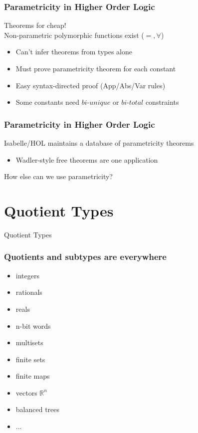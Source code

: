 \documentclass[english]{beamer}
\begin{document}
\begin{frame}
\frametitle{Parametricity in Higher Order Logic}
{\large{Theorems for  cheap!}}\\
\bigskip
Non-parametric polymorphic functions exist ($=, \forall$)
\begin{itemize}
\item Can't infer theorems from types alone
\item Must prove parametricity theorem for each constant
\item Easy syntax-directed proof (App/Abs/Var rules)
\item Some constants need $\mathit{bi\textit{-}unique}$ or $\mathit{bi\textit{-}total}$ constraints
\end{itemize}
\end{frame}

\begin{frame}
\frametitle{Parametricity in Higher Order Logic}
Isabelle/HOL maintains a database of parametricity theorems
\medskip
\begin{itemize}
\item Wadler-style free theorems are one application
\end{itemize}
\bigskip
How else can we use parametricity?
\end{frame}


\section{Quotient Types}
\begin{frame}
\begin{center}
\huge{Quotient Types}
\end{center}
\end{frame}

\begin{frame}
\frametitle{Quotients and subtypes are everywhere}
\begin{itemize}
\item integers
\item rationals
\item reals
\item n-bit words
\item multisets
\item finite sets
\item finite maps
\item vectors $\mathbb{R}^n$
\item balanced trees
\item ...
\end{itemize}
\end{frame}
\end{document}
